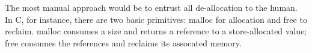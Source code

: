 \secdown

The most manual approach would be to entrust all de-allocation to the human. In
C, for instance, there are two basic primitives: malloc for allocation and free
to reclaim. malloc consumes a size and returns a reference to a store-allocated
value; free consumes the references and reclaims its assocated memory.



\secup
